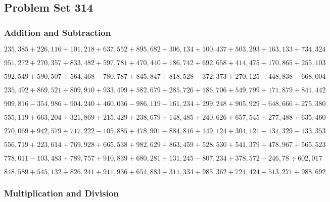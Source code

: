 \hypertarget{problem-set-314}{%
\subsection{Problem Set 314}\label{problem-set-314}}

\hypertarget{addition-and-subtraction}{%
\subsubsection{Addition and
Subtraction}\label{addition-and-subtraction}}

\(235,385+226,116+101,218+637,552+895,682+306,134+100,437+503,293+163,133+734,324\)

\(951,272+270,357+833,482+597,781+470,440+186,742+692,658+414,475+170,865+255,103\)

\(592,549+590,507+564,468-780,787+845,847+818,528-372,373+270,125-448,838-668,004\)

\(235,492+869,521+809,910+933,499+582,679+285,726+186,706+549,799+171,879+841,442\)

\(909,816-354,986+904,240+460,036-986,119-161,234+299,248+905,929-648,666+275,380\)

\(555,119+663,204+321,869+215,429+238,679+148,485+240,626+657,545+277,488+635,460\)

\(270,069+942,579+717,222-105,885+478,901-884,816+149,124+304,121-131,329-133,353\)

\(556,719+223,614+769,928+665,538+982,629+863,459+528,530+541,379+478,967+565,523\)

\(778,011-103,483+789,757+910,839+680,281+131,245-807,234+378,572-246,78÷602,017\)

\(848,589+545,132+826,241+911,936+651,883+311,334+985,362+724,424+513,271+988,692\)

\hypertarget{multiplication-and-division}{%
\subsubsection{Multiplication and
Division}\label{multiplication-and-division}}

